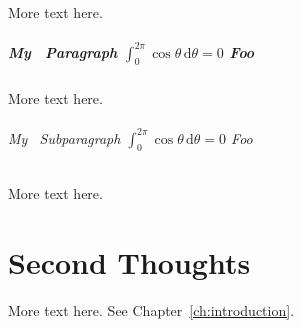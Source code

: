 \documentclass{admbmanual}
\begin{document}
More text here.


\paragraph{My \scAD\ Paragraph $\int^{2\pi}_0\cos\theta\,\mathrm{d}\theta=0$ Foo}  More text here.


\subparagraph{My \scAD\ Subparagraph $\int^{2\pi}_0\cos\theta\,\mathrm{d}\theta=0$ Foo} More text here.


\chapter{Second Thoughts}

More text here.  See Chapter~\ref{ch:introduction}.


\nocite{*}
 


\printindex
\end{document}
